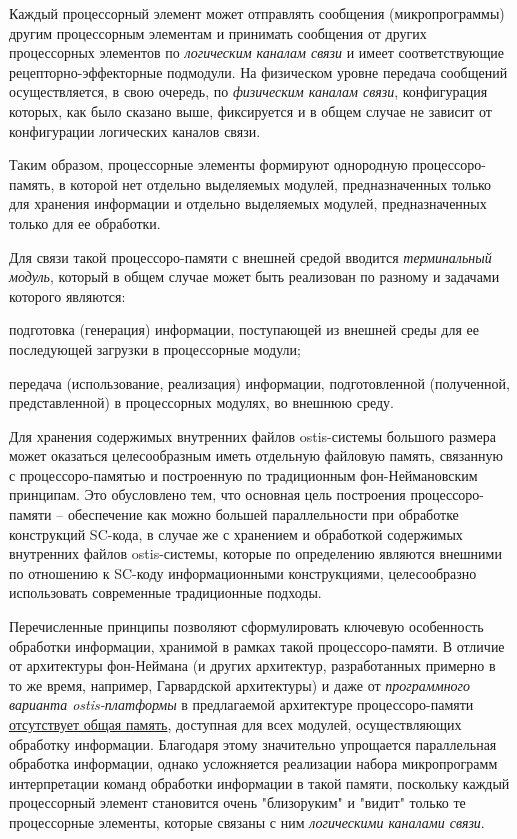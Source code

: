 \begin{textitemize}
	\item Каждый процессорный элемент может отправлять сообщения (микропрограммы) другим процессорным элементам и принимать сообщения от других процессорных элементов по \textit{логическим каналам связи} и имеет соответствующие рецепторно-эффекторные подмодули. На физическом уровне передача сообщений осуществляется, в свою очередь, по \textit{физическим каналам связи}, конфигурация которых, как было сказано выше, фиксируется и в общем случае не зависит от конфигурации логических каналов связи.
	\item Таким образом, процессорные элементы формируют однородную процессоро-память, в которой нет отдельно выделяемых модулей, предназначенных только для хранения информации и отдельно выделяемых модулей, предназначенных только для ее обработки. 
	\item Для связи такой процессоро-памяти с внешней средой вводится \textit{терминальный модуль}, который в общем случае может быть реализован по разному и задачами которого являются:
	\begin{textitemize}
		\item подготовка (генерация) информации, поступающей из внешней среды для ее последующей загрузки в процессорные модули;
		\item передача (использование, реализация) информации, подготовленной (полученной, представленной) в процессорных модулях, во внешнюю среду.
	\end{textitemize}
	\item Для хранения содержимых внутренних файлов ostis-системы большого размера может оказаться целесообразным иметь отдельную файловую память, связанную с процессоро-памятью и построенную по традиционным фон-Неймановским принципам. Это обусловлено тем, что основная цель построения процессоро-памяти -- обеспечение как можно большей параллельности при обработке конструкций SC-кода, в случае же с хранением и обработкой содержимых внутренних файлов ostis-системы, которые по определению являются внешними по отношению к SC-коду информационными конструкциями, целесообразно использовать современные традиционные подходы.
\end{textitemize}

Перечисленные принципы позволяют сформулировать ключевую особенность обработки информации, хранимой в рамках такой процессоро-памяти. В отличие от архитектуры фон-Неймана (и других архитектур, разработанных примерно в то же время, например, Гарвардской архитектуры) и даже от \textit{программного варианта ostis-платформы} в предлагаемой архитектуре процессоро-памяти \underline{отсутствует общая память}, доступная для всех модулей, осуществляющих обработку информации. Благодаря этому значительно упрощается параллельная обработка информации, однако усложняется реализации набора микропрограмм интерпретации команд обработки информации в такой памяти, поскольку каждый процессорный элемент становится очень "близоруким"{} и "видит"{} только те процессорные элементы, которые связаны с ним \textit{логическими каналами связи}. 

